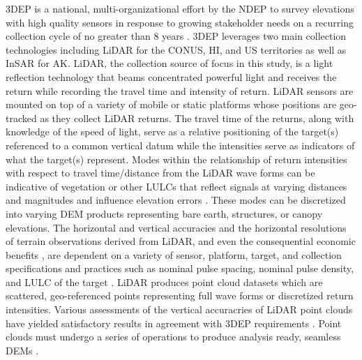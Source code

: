 \documentclass[water,article,submit,pdftex,moreauthors]{dependencies/Definitions/mdpi}
\begin{document}
\ac{3DEP} is a national, multi-organizational effort by the \ac{NDEP} to survey elevations with high quality sensors in response to growing stakeholder needs on a recurring collection cycle of no greater than 8 \acp{year} \cite{dewberry2011final,snyder2013national,sugarbaker20143d}.
\ac{3DEP} leverages two main collection technologies including \ac{LiDAR} for the \ac{CONUS}, \ac{HI}, and \ac{US} territories as well as \ac{InSAR} for \ac{AK}.
\ac{LiDAR}, the collection source of focus in this study, is a light reflection technology that beams concentrated powerful light and receives the return while recording the travel time and intensity of return. 
\ac{LiDAR} sensors are mounted on top of a variety of mobile or static platforms whose positions are geo-tracked as they collect \ac{LiDAR} returns.
The travel time of the returns, along with knowledge of the speed of light, serve as a relative positioning of the target(s) referenced to a common vertical datum while the intensities serve as indicators of what the target(s) represent.
Modes within the relationship of return intensities with respect to travel time/distance from the \ac{LiDAR} wave forms can be indicative of vegetation or other \acp{LULC} that reflect signals at varying distances and magnitudes and influence elevation errors \cite{gesch2014accuracy}.
These modes can be discretized into varying \ac{DEM} products representing bare earth, structures, or canopy elevations.
The horizontal and vertical accuracies and the horizontal resolutions of terrain observations derived from \ac{LiDAR}, and even the consequential economic benefits \cite{dewberry2011final,dewberry2022nation}, are dependent on a variety of sensor, platform, target, and collection specifications and practices such as nominal pulse spacing, nominal pulse density, and \ac{LULC} of the target \cite{heidemann2018lidar,passalacqua2015analyzing,smith2019determining,salach2018accuracy,gesch2014accuracy}.
\ac{LiDAR} produces point cloud datasets which are scattered, geo-referenced points representing full wave forms or discretized return intensities.
Various assessments of the vertical accuracries of \ac{LiDAR} point clouds have yielded satisfactory results in agreement with \ac{3DEP} requirements \cite{stoker2022accuracy,kim2022absolute,callahan2022vertical,kim2022absolute,salach2018accuracy,passalacqua2015analyzing}.
Point clouds must undergo a series of operations to produce analysis ready, seamless \acp{DEM} \cite{passalacqua2015analyzing}.
\end{document}
